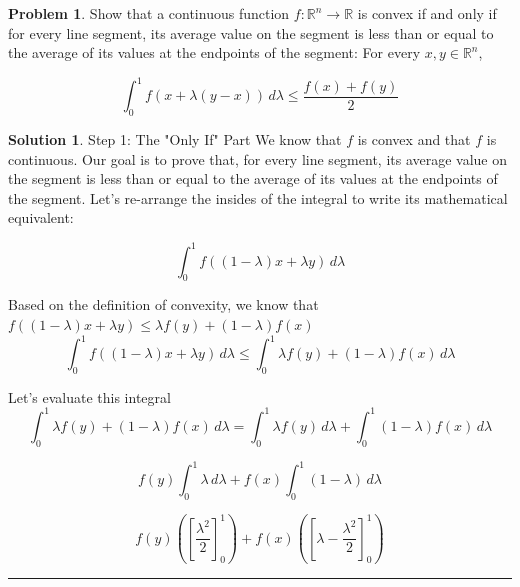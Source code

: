 \documentclass{article}
\theoremstyle{definition}
\newtheorem{problem}{Problem}
\def\fline{\rule{0.75\linewidth}{0.5pt}}
\newcommand{\finishline}{\begin{center}\fline\end{center}}
\newtheorem*{solution*}{Solution}
\newenvironment{solution}{\begin{solution*}}{{\finishline} \end{solution*}}
\begin{document}
\begin{problem}
    Show that a continuous function $f: \mathbb{R}^n \rightarrow \mathbb{R}$ is convex if and only if for every line segment, its average value on the segment is less than or equal to the average of its values at the endpoints of the segment: For every $x, y \in \mathbb{R}^n$,

    \begin{equation}
        \label{eq:example}
            \int_{0}^{1} f(x + \lambda(y - x)) \,d \lambda \leq \frac{f(x) + f(y)}{2}
    \end{equation}

    \begin{solution}
        Step 1: The "Only If" Part \newline 
        We know that $f$ is convex and that $f$ is continuous. Our goal is to prove that, for every line segment, its average value on the segment is less than or equal to the average of its values at the endpoints of the segment. Let's re-arrange the insides of the integral to write its mathematical equivalent: 

        \begin{equation}
        \label{eq:example}
            \int_{0}^{1} f((1 - \lambda)x + \lambda y) \,d \lambda
    \end{equation}

Based on the definition of convexity, we know that $f((1 - \lambda)x + \lambda y) \leq \lambda f(y) + (1 - \lambda) f(x)$
    \begin{equation}
        \label{eq:example}
            \int_{0}^{1} f((1 - \lambda)x + \lambda y) \,d \lambda \leq \int_{0}^{1} \lambda f(y) + (1 - \lambda) f(x) \,d \lambda
    \end{equation}

Let's evaluate this integral \newline 
\begin{equation}
        \label{eq:example}
            \int_{0}^{1} \lambda f(y) + (1 - \lambda) f(x) \,d \lambda =  \int_{0}^{1} \lambda f(y) \,d \lambda +  \int_{0}^{1} (1 - \lambda) f(x) \,d \lambda
    \end{equation}

    \begin{equation}
        \label{eq:example}
            f(y) \int_{0}^{1} \lambda \,d \lambda +  f(x) \int_{0}^{1} (1 - \lambda) \,d \lambda
    \end{equation}

    \begin{equation}
        \label{eq:example}
            f(y) ([\frac{\lambda^2}{2}]^1_0) +  f(x) ([\lambda - \frac{\lambda^2}{2}]^1_0)
    \end{equation}


\end{solution}
\end{problem}
\end{document}
